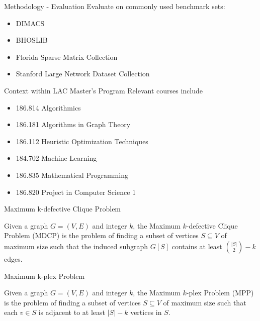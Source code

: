 \documentclass{beamer}
\begin{document}
\begin{frame}{Methodology - Evaluation}
    Evaluate on commonly used benchmark sets:
    \begin{itemize}
        \item DIMACS
        \item BHOSLIB
        \item Florida Sparse Matrix Collection
        \item Stanford Large Network Dataset Collection
    \end{itemize}
\end{frame}

\begin{frame}{Context within LAC Master's Program}
Relevant courses include
\begin{itemize}
	\item 186.814 Algorithmics
	\item 186.181 Algorithms in Graph Theory
	\item 186.112 Heuristic Optimization Techniques
	\item 184.702 Machine Learning
	\item 186.835 Mathematical Programming
	\item 186.820 Project in Computer Science 1
\end{itemize}
\end{frame}

 


\begin{frame}{Maximum k-defective Clique Problem}
    \begin{definition}
	\label{def:mdcp}
	Given a graph $G = (V,E)$ and integer $k$, the Maximum $k$-defective Clique Problem (MDCP) is the problem of finding a subset of vertices $S \subseteq V$ of maximum size 
	such that the induced subgraph $G[S]$ contains at least $\binom{|S|}{2} - k$ edges. 
\end{definition}
\end{frame}

\begin{frame}{Maximum k-plex Problem}
    \begin{definition}
	\label{def:mpp}
	Given a graph $G = (V,E)$ and integer $k$, the Maximum $k$-plex Problem (MPP) is the problem of finding a subset of vertices $S \subseteq V$ of maximum size 
	such that each $v \in S$ is adjacent to at least $|S| - k$ vertices in $S$. 
\end{definition}
\end{frame}
\end{document}
